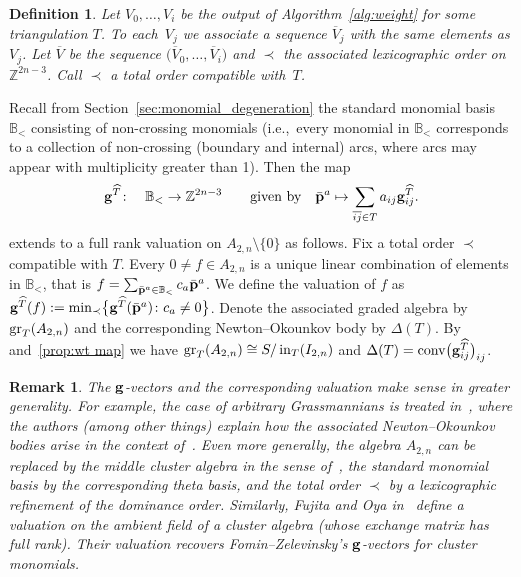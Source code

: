 \documentclass[10pt,a4paper]{amsart}
\newcommand{\thlabel}[1]{\label{#1}}
\newcommand{\thref}[1]{\ref{#1}}
\newtheorem{Definition}[Theorem]{Definition}
\newtheorem{Remark}[Theorem]{Remark}}
\numberwithin{equation}{section}
\DeclareMathOperator{\init}{in}
\begin{document}
\begin{Definition}\thlabel{rmk:compatible order}
Let $V_0,\dots,V_i$ be the output of Algorithm~\ref{alg:weight} for some triangulation $T$.
To each~$V_j$ we associate a sequence $\overline{V}_j$ with the same elements as $V_j$.
Let $\overline{V}$ be the sequence $\big(\overline{V}_0,\dots,\overline{V}_i\big)$ and $\prec$ the associated lexicographic order on $\mathbb Z^{2n-3}$.
Call $\prec$ a {\it total order compatible with~$T$}.
\end{Definition}

Recall from Section~\ref{sec:monomial_degeneration} the standard monomial basis $\mathbb B_{<}$ consisting of non-crossing monomials
(i.e.,~every monomial in $\mathbb B_{<}$ corresponds to a collection of non-crossing (boundary and internal) arcs, where arcs may appear with multiplicity greater than 1).
Then the map
\begin{equation}\label{eq:g-map}
{\bf g}^{\widehat{T}}\colon\quad \mathbb B_{<} \to \mathbb Z^{2n-3} \qquad \text{given by} \quad
\bar{\bf p}^a \mapsto \sum_{\overline{ij}\in T} a_{ij}{\bf g}_{ij}^{\widehat{T}}.
\end{equation}
extends to a full rank valuation on $A_{2,n}\setminus \{0\}$ as follows.
Fix a total order $\prec$ compatible with $T$.
Every $0\neq f\in A_{2,n}$ is a unique linear combination of elements in $\mathbb B_{<}$, that is $f=\sum_{\bar{\bf p}^a\in \mathbb B_{<}}c_a\bar {\bf p}^a$. We define the valuation of $f$ as
${\bf g}^{\widehat{T}}(f):= {\rm min}_{\prec} \big\{{\bf g}^{\widehat{T}}(\bar{\bf p}^a)\colon c_a\not =0\big\}$.
Denote the associated graded algebra by ${\rm gr}_{T}(A_{2,n})$ and the corresponding Newton--Okounkov body by $\Delta(T)$.
By~\cite[Corollary~2]{B-quasival} and~\thref{prop:wt map} we have ${\rm gr}_T(A_{2,n})\cong S/\init_T(I_{2,n})$ and $\Delta(T)={\rm conv}\big({\bf g}^{\widehat{T}}_{ij}\big)_{ij}$.

\begin{Remark}\thlabel{rem:gv val}
The ${\bf g}$-vectors and the corresponding valuation make sense in greater generality. For example, the case of arbitrary Grassmannians is treated in~\cite{BCMN}, where the authors (among other things) explain how the associated Newton--Okounkov bodies arise in the context of~\cite{GHKK}.
Even more generally, the algebra $A_{2,n}$ can be replaced by the {\it middle cluster algebra} in the sense of~\cite{GHKK}, the standard monomial basis by the corresponding {\it theta basis}, and the total order $\prec$ by a lexicographic refinement of the {\it dominance order}.
Similarly, Fujita and Oya in~\cite[Section~3]{FO20} define a valuation on the ambient field of a cluster algebra (whose exchange matrix has full rank). Their valuation recovers Fomin--Zelevinsky's ${\bf g}$-vectors for cluster monomials.
\end{Remark}
\end{document}
